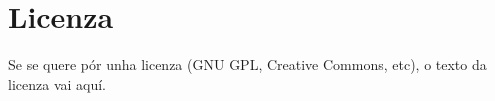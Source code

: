 \chapter{Licenza}
Se se quere pór unha licenza (GNU GPL, Creative Commons, etc), o texto da licenza vai aquí.

